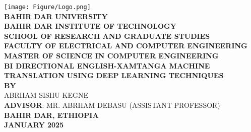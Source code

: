 \begin{titlepage}
    \begin{center}
        \texttt{[image: Figure/Logo.png]}\\[0.75cm] 
        \large \uppercase{\textbf{BAHIR DAR UNIVERSITY}}\\
        \vspace{0.25cm}
        \large\uppercase{\textbf{BAHIR DAR INSTITUTE OF TECHNOLOGY}}\\
        \vspace{0.25cm}
        \large\uppercase{\textbf{SCHOOL OF RESEARCH AND GRADUATE STUDIES}}\\
        \vspace{0.25cm}
        \large\uppercase{\textbf{FACULTY OF ELECTRICAL AND COMPUTER ENGINEERING}}\\
        \vspace{0.25cm}
        \large\uppercase{\textbf{MASTER OF SCIENCE IN COMPUTER ENGINEERING}}\\
        \vspace{0.25cm}
        \large\uppercase{\textbf{BI DIRECTIONAL ENGLISH-XAMTANGA MACHINE TRANSLATION USING DEEP LEARNING TECHNIQUES}}\\
        \vspace{0.25cm}
        \textbf{BY}\\
        \vspace{0.25cm}
        \large\uppercase{ABRHAM SISHU KEGNE}\\
        \large\uppercase{\textbf{Advisor}: Mr. Abrham Debasu (Assistant Professor)}\\
        \vspace{1.5cm}
        \large\uppercase{\textbf{BAHIR DAR, Ethiopia}}\\
        \vspace{0.25cm}
        \large\uppercase{\textbf{JANUARY 2025}}\\
    \end{center}
\end{titlepage}
